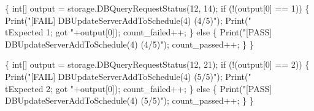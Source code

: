 \documentclass{article}
\def\nwendcode{\endtrivlist \endgroup}
\let\nwdocspar=\par
\begin{document}
\{
  int[] output = storage.DBQueryRequestStatus(12, 14);
  if (!(output[0] == 1)) \{
    Print("[FAIL] DBUpdateServerAddToSchedule(4) (4/5)");
    Print("\\tExpected 1; got "+output[0]);
    count_failed++;
  \} else \{
    Print("[PASS] DBUpdateServerAddToSchedule(4) (4/5)");
    count_passed++;
  \}
\}
\nwendcode{}\nwdocspar
\nwenddocs{}\endmoddef{}
\{
  int[] output = storage.DBQueryRequestStatus(12, 21);
  if (!(output[0] == 2)) \{
    Print("[FAIL] DBUpdateServerAddToSchedule(4) (5/5)");
    Print("\\tExpected 2; got "+output[0]);
    count_failed++;
  \} else \{
    Print("[PASS] DBUpdateServerAddToSchedule(4) (5/5)");
    count_passed++;
  \}
\}
\nwendcode{}\nwdocspar
\end{document}
